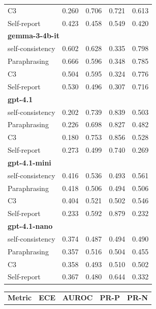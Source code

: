 \documentclass[11pt]{article}
\theoremstyle{plain}
\theoremstyle{definition}
\theoremstyle{remark}
\begin{document}
\begin{table}[p]
\begin{minipage}[t]{0.48\textwidth}
\begin{tabular}{lcccc}
       C3             & 0.260 & 0.706 & 0.721 & 0.613 \\
        Self-report      & 0.423 & 0.458 & 0.549 & 0.420 \\
        \midrule
        \multicolumn{5}{l}{\textbf{gemma-3-4b-it}} \\
        self-consistency & 0.602 & 0.628 & 0.335 & 0.798 \\
        Paraphrasing     & 0.666 & 0.596 & 0.348 & 0.785 \\
       C3             & 0.504 & 0.595 & 0.324 & 0.776 \\
        Self-report      & 0.530 & 0.496 & 0.307 & 0.716 \\
        \midrule
        \multicolumn{5}{l}{\textbf{gpt-4.1}} \\
        self-consistency & 0.202 & 0.739 & 0.839 & 0.503 \\
        Paraphrasing     & 0.226 & 0.698 & 0.827 & 0.482 \\
       C3             & 0.180 & 0.753 & 0.856 & 0.528 \\
        Self-report      & 0.273 & 0.499 & 0.740 & 0.269 \\
        \midrule
        \multicolumn{5}{l}{\textbf{gpt-4.1-mini}} \\
        self-consistency & 0.416 & 0.536 & 0.493 & 0.561 \\
        Paraphrasing     & 0.418 & 0.506 & 0.494 & 0.506 \\
       C3             & 0.404 & 0.521 & 0.502 & 0.546 \\
        Self-report      & 0.233 & 0.592 & 0.879 & 0.232 \\
        \midrule
        \multicolumn{5}{l}{\textbf{gpt-4.1-nano}} \\
        self-consistency & 0.374 & 0.487 & 0.494 & 0.490 \\
        Paraphrasing     & 0.357 & 0.516 & 0.504 & 0.455 \\
       C3             & 0.358 & 0.493 & 0.510 & 0.502 \\
        Self-report      & 0.367 & 0.480 & 0.644 & 0.332 \\
        \bottomrule
    \end{tabular}
\end{minipage}
\hfill
\begin{minipage}[t]{0.48\textwidth}
    \centering
    \begin{tabular}{lcccc}
        \toprule
        \textbf{Metric} & \textbf{ECE} & \textbf{AUROC} & \textbf{PR-P} & \textbf{PR-N} \\

\end{tabular}
\end{minipage}
\end{table}
\end{document}
